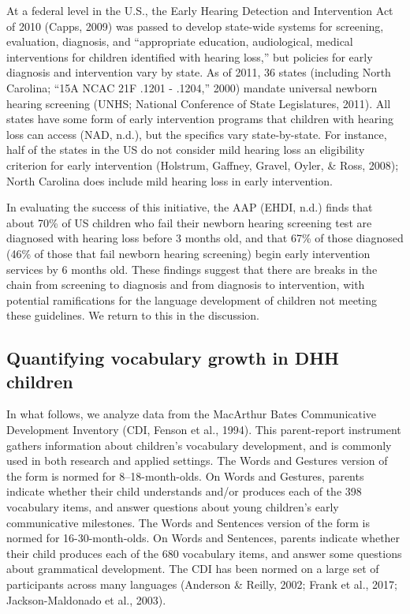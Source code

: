 \documentclass[english,man]{apa6}
\begin{document}
At a federal level in the U.S., the Early Hearing Detection and Intervention Act of 2010 (Capps, 2009) was passed to develop state-wide systems for screening, evaluation, diagnosis, and \enquote{appropriate education, audiological, medical interventions for children identified with hearing loss,} but policies for early diagnosis and intervention vary by state. As of 2011, 36 states (including North Carolina; ``15A NCAC 21F .1201 - .1204,'' 2000) mandate universal newborn hearing screening (UNHS; National Conference of State Legislatures, 2011). All states have some form of early intervention programs that children with hearing loss can access (NAD, n.d.), but the specifics vary state-by-state. For instance, half of the states in the US do not consider mild hearing loss an eligibility criterion for early intervention (Holstrum, Gaffney, Gravel, Oyler, \& Ross, 2008); North Carolina does include mild hearing loss in early intervention.

In evaluating the success of this initiative, the AAP (EHDI, n.d.) finds that about 70\% of US children who fail their newborn hearing screening test are diagnosed with hearing loss before 3 months old, and that 67\% of those diagnosed (46\% of those that fail newborn hearing screening) begin early intervention services by 6 months old. These findings suggest that there are breaks in the chain from screening to diagnosis and from diagnosis to intervention, with potential ramifications for the language development of children not meeting these guidelines. We return to this in the discussion.

\hypertarget{quantifying-vocabulary-growth-in-dhh-children}{%
\subsection{Quantifying vocabulary growth in DHH children}\label{quantifying-vocabulary-growth-in-dhh-children}}

In what follows, we analyze data from the MacArthur Bates Communicative Development Inventory (CDI, Fenson et al., 1994). This parent-report instrument gathers information about children's vocabulary development, and is commonly used in both research and applied settings. The Words and Gestures version of the form is normed for 8--18-month-olds. On Words and Gestures, parents indicate whether their child understands and/or produces each of the 398 vocabulary items, and answer questions about young children's early communicative milestones. The Words and Sentences version of the form is normed for 16-30-month-olds. On Words and Sentences, parents indicate whether their child produces each of the 680 vocabulary items, and answer some questions about grammatical development. The CDI has been normed on a large set of participants across many languages (Anderson \& Reilly, 2002; Frank et al., 2017; Jackson-Maldonado et al., 2003).
\end{document}
